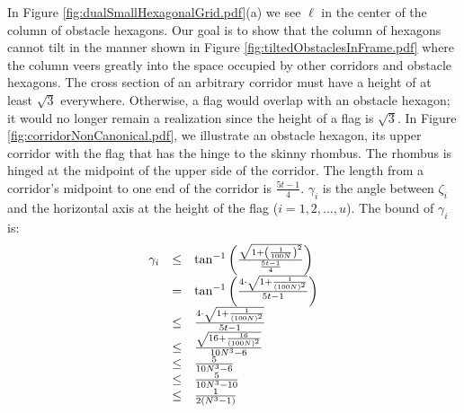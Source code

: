 In Figure \ref{fig:dualSmallHexagonalGrid.pdf}(a) we see $\ell$ in the center of the column of obstacle hexagons.  
Our goal is to show that the column of hexagons cannot tilt in the manner shown in Figure \ref{fig:tiltedObstaclesInFrame.pdf} where the column veers greatly into the space occupied by other corridors and obstacle hexagons.
The cross section of an arbitrary corridor must have a height of at least $\sqrt{3}$ everywhere. 
Otherwise, a flag would overlap with an obstacle hexagon; it would no longer remain a realization since the height of a flag is $\sqrt{3}$.
In Figure \ref{fig:corridorNonCanonical.pdf}, we illustrate an obstacle hexagon, its upper corridor with the flag that has the hinge to the skinny rhombus.  
The rhombus is hinged at the midpoint of the upper side of the corridor.
The length from a corridor's midpoint to one end of the corridor is $\frac{5t-1}{4}$.
$\gamma_i$ is the angle between $\zeta_i$ and the horizontal axis at the height of the flag ($i = 1,2,\ldots, u$).
The bound of $\gamma_i$ is:
\begin{equation}\label{eqn:gammaBound}
\begin{array}{rcl}
\gamma_i &\leq & \tan^{-1} \left( 
								\frac{
										\sqrt{1+ \left( 	\frac{1}{100N}	 \right)^2}
								}{
										\frac{5t-1}{4}
								}	
							 \right)\\
&=& \tan^{-1} \left( \frac{4\cdot \sqrt{1 + \frac{1}{(100N)^2}}}{5t-1} \right)\\
&\leq& \frac{4\cdot \sqrt{1 + \frac{1}{(100N)^2}}}{5t-1}\\
&\leq& \frac{\sqrt{16 + \frac{16}{(100N)^2}}}{10N^3 -6}\\
&\leq& \frac{5}{10N^3 -6}\\
&\leq& \frac{5}{10N^3 - 10}\\
&\leq& \frac{1}{2\left( N^3 - 1 \right)}
\end{array} 
\end{equation}

